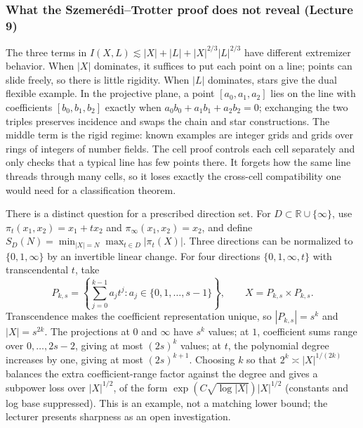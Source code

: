 \subsubsection{What the Szemerédi--Trotter proof does not reveal (Lecture 9)}\label{04-visual-computing-ii-ch033-what-the-szemeruxe9ditrotter-proof-does-not-reveal-lecture-9}

The three terms in \(I(X,L)\lesssim |X|+|L|+|X|^{2/3}|L|^{2/3}\) have different extremizer behavior. When \(|X|\) dominates, it suffices to put each point on a line; points can slide freely, so there is little rigidity. When \(|L|\) dominates, stars give the dual flexible example. In the projective plane, a point \([a_0,a_1,a_2]\) lies on the line with coefficients \([b_0,b_1,b_2]\) exactly when \(a_0b_0+a_1b_1+a_2b_2=0\); exchanging the two triples preserves incidence and swaps the chain and star constructions. The middle term is the rigid regime: known examples are integer grids and grids over rings of integers of number fields. The cell proof controls each cell separately and only checks that a typical line has few points there. It forgets how the same line threads through many cells, so it loses exactly the cross-cell compatibility one would need for a classification theorem.

There is a distinct question for a prescribed direction set. For \(D\subset\mathbb R\cup\{\infty\}\), use \(\pi_t(x_1,x_2)=x_1+tx_2\) and \(\pi_\infty(x_1,x_2)=x_2\), and define \(S_D(N)=\min_{|X|=N}\max_{t\in D}|\pi_t(X)|\). Three directions can be normalized to \(\{0,1,\infty\}\) by an invertible linear change. For four directions \(\{0,1,\infty,t\}\) with transcendental \(t\), take \[
P_{k,s}=\left\{\sum_{j=0}^{k-1}a_jt^j: a_j\in\{0,1,\ldots,s-1\}\right\},\qquad X=P_{k,s}\times P_{k,s}.
\] Transcendence makes the coefficient representation unique, so \(|P_{k,s}|=s^k\) and \(|X|=s^{2k}\). The projections at \(0\) and \(\infty\) have \(s^k\) values; at \(1\), coefficient sums range over \(0,\ldots,2s-2\), giving at most \((2s)^k\) values; at \(t\), the polynomial degree increases by one, giving at most \((2s)^{k+1}\). Choosing \(k\) so that \(2^k\asymp |X|^{1/(2k)}\) balances the extra coefficient-range factor against the degree and gives a subpower loss over \(|X|^{1/2}\), of the form \(\exp(C\sqrt{\log |X|})|X|^{1/2}\) (constants and log base suppressed). This is an example, not a matching lower bound; the lecturer presents sharpness as an open investigation.

